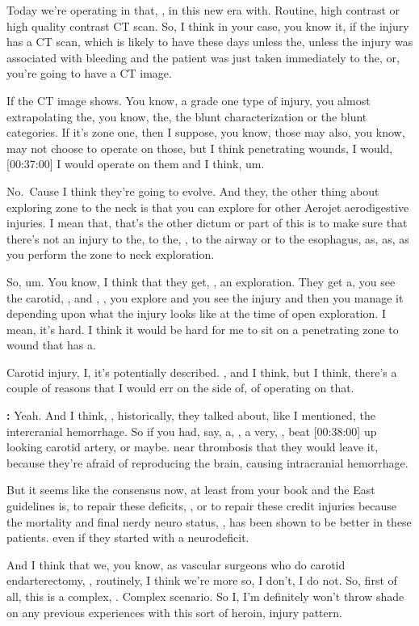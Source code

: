 \documentclass[
]{book}
\begin{document}
Today we're operating in that, , in this new era with. Routine, high
contrast or high quality contrast CT scan. So, I think in your case,
you know it, if the injury has a CT scan, which is likely to have
these days unless the, unless the injury was associated with bleeding
and the patient was just taken immediately to the, or, you're going to
have a CT image.

If the CT image shows. You know, a grade one type of injury, you almost
extrapolating the, you know, the, the blunt characterization or the
blunt categories. If it's zone one, then I suppose, you know, those may
also, you know, may not choose to operate on those, but I think
penetrating wounds, I would, {[}00:37:00{]} I would operate on them and I
think, um.

No.~Cause I think they're going to evolve. And they, the other thing
about exploring zone to the neck is that you can explore for other
Aerojet aerodigestive injuries. I mean that, that's the other dictum or
part of this is to make sure that there's not an injury to the, to the,
, to the airway or to the esophagus, as, as, as you perform the zone to
neck exploration.

So, um. You know, I think that they get, , an exploration. They get a,
you see the carotid, , and , , you explore and you see the injury and
then you manage it depending upon what the injury looks like at the time
of open exploration. I mean, it's hard. I think it would be hard for me
to sit on a penetrating zone to wound that has a.

Carotid injury, I, it's potentially described. , and I think,
but I think, there's a couple of reasons that I would err on the
side of, of operating on that.

\textbf{:} Yeah. And I
think, , historically, they talked about, like I mentioned, the
intercranial hemorrhage. So if you had, say, a, , a very, , beat
{[}00:38:00{]} up looking carotid artery, or maybe. near thrombosis that
they would leave it, because they're afraid of reproducing the
brain, causing intracranial hemorrhage.

But it seems like the consensus now, at least from your book and the
East guidelines is, to repair these deficits, , or to repair these
credit injuries because the mortality and final nerdy neuro status, ,
has been shown to be better in these patients. even if they started with
a neurodeficit.

And I think
that we, you know, as vascular surgeons who do carotid endarterectomy, ,
routinely, I think we're more so, I don't, I do not. So, first of all,
this is a complex, . Complex scenario. So I, I'm definitely won't throw
shade on any previous experiences with this sort of heroin, injury
pattern.
\end{document}
